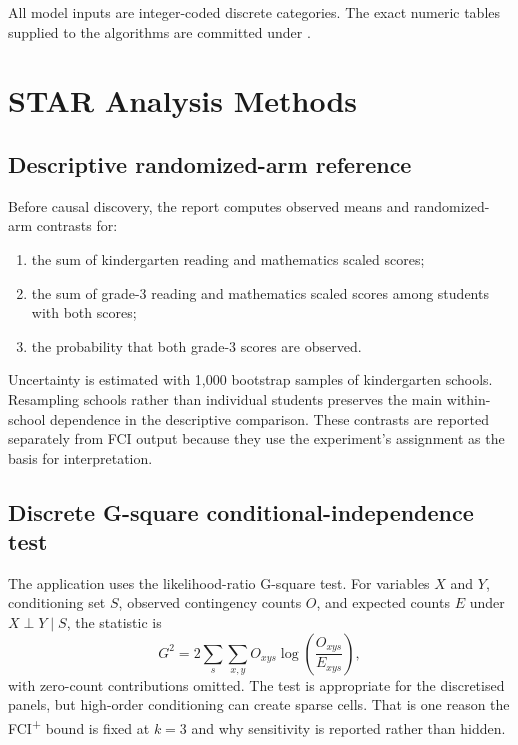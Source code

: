 \documentclass[11pt,a4paper,oneside]{report}
\newcommand{\FCIplus}{FCI\textsuperscript{+}}
\begin{document}
All model inputs are integer-coded discrete categories. The exact numeric
tables supplied to the algorithms are committed under
.

\chapter{STAR Analysis Methods}

\section{Descriptive randomized-arm reference}

Before causal discovery, the report computes observed means and
randomized-arm contrasts for:

\begin{enumerate}[leftmargin=2em]
  \item the sum of kindergarten reading and mathematics scaled scores;
  \item the sum of grade-3 reading and mathematics scaled scores among
        students with both scores;
  \item the probability that both grade-3 scores are observed.
\end{enumerate}

Uncertainty is estimated with 1,000 bootstrap samples of kindergarten schools.
Resampling schools rather than individual students preserves the main
within-school dependence in the descriptive comparison. These contrasts are
reported separately from FCI output because they use the experiment's
assignment as the basis for interpretation.

\section{Discrete G-square conditional-independence test}

The application uses the likelihood-ratio G-square test. For variables \(X\)
and \(Y\), conditioning set \(S\), observed contingency counts \(O\), and
expected counts \(E\) under \(X\perp Y\mid S\), the statistic is
\[
  G^2 = 2\sum_{s}\sum_{x,y}
        O_{xys}\log\left(\frac{O_{xys}}{E_{xys}}\right),
\]
with zero-count contributions omitted. The test is appropriate for the
discretised panels, but high-order conditioning can create sparse cells. That
is one reason the \FCIplus{} bound is fixed at \(k=3\) and why sensitivity is
reported rather than hidden.
\end{document}
